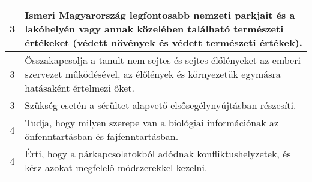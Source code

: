 \begin{longtable}{c | p{} }
                                
                                          3 &  Ismeri Magyarország legfontosabb nemzeti parkjait és a lakóhelyén vagy annak közelében található természeti értékeket (védett növények és védett természeti értékek). \\ \hline
                                          3 &  Összakapcsolja a tanult nem sejtes és sejtes élőlényeket az emberi szervezet működésével, az élőlények és környezetük egymásra hatásaként értelmezi őket. \\ \hline
                                          3 &  Szükség esetén a sérültet alapvető elsősegélynyújtásban részesíti. \\ \hline
                                      
                                
                                          4 &  Tudja, hogy milyen szerepe van a biológiai információnak az önfenntartásban és fajfenntartásban. \\ \hline
                                          4 &  Érti, hogy a párkapcsolatokból adódnak konfliktushelyzetek, és kész azokat megfelelő módszerekkel kezelni. \\ \hline
                                      
                        \end{longtable}
            \clearpage

